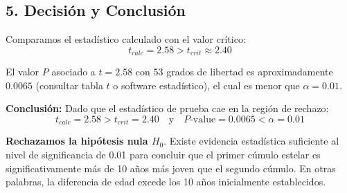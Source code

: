 \documentclass[12pt]{article}
\begin{document}
\subsection*{5. Decisión y Conclusión}

Comparamos el estadístico calculado con el valor crítico:
$$ t_{calc} = 2.58 > t_{crit} \approx 2.40 $$

El valor $P$ asociado a $t=2.58$ con 53 grados de libertad es aproximadamente $0.0065$ (consultar tabla $t$ o software estadístico), el cual es menor que $\alpha = 0.01$.

\textbf{Conclusión:} Dado que el estadístico de prueba cae en la región de rechazo:
$$t_{calc} = 2.58 > t_{crit} = 2.40 \quad \text{y} \quad P\text{-value} = 0.0065 < \alpha = 0.01$$

\textbf{Rechazamos la hipótesis nula $H_0$}. Existe evidencia estadística suficiente al nivel de significancia de 0.01 para concluir que el primer cúmulo estelar es significativamente más de 10 años más joven que el segundo cúmulo. En otras palabras, la diferencia de edad excede los 10 años inicialmente establecidos.
\end{document}
